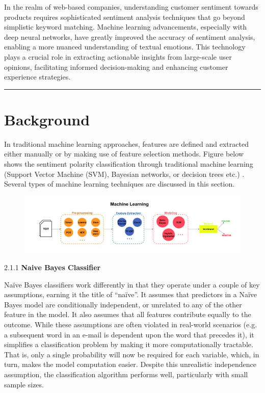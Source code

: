 \documentclass[a4paper]{article}
\theoremstyle{plain}
\theoremstyle{definition}
\begin{document}
In the realm of web-based companies, understanding customer sentiment towards products requires sophisticated sentiment analysis techniques that go beyond simplistic keyword matching. Machine learning advancements, especially with deep neural networks, have greatly improved the accuracy of sentiment analysis, enabling a more nuanced understanding of textual emotions. This technology plays a crucial role in extracting actionable insights from large-scale user opinions, facilitating informed decision-making and enhancing customer experience strategies.
\vspace{0.3 cm}
\hrule{}
\section{Background}
	\label{sec:app}
In traditional machine learning approaches, features are defined and extracted either manually
or by making use of feature selection methods. Figure below shows the
sentiment polarity classification through traditional machine learning (Support
Vector Machine (SVM), Bayesian networks, or decision trees etc.) . Several types of machine learning
techniques are discussed in this section.
\begin{figure}[htbp] %
    \includegraphics[width=1\textwidth]{figs/ml.png} %
    \label{fig:example}
\end{figure}

2.1.1 \textbf{Naive Bayes Classifier\newline}

Naïve Bayes classifiers work differently in that they operate under a couple of key assumptions, earning it the title of “naïve”. It assumes that predictors in a Naïve Bayes model are conditionally independent, or unrelated to any of the other feature in the model. It also assumes that all features contribute equally to the outcome. While these assumptions are often violated in real-world scenarios (e.g. a subsequent word in an e-mail is dependent upon the word that precedes it), it simplifies a classification problem by making it more computationally tractable. That is, only a single probability will now be required for each variable, which, in turn, makes the model computation easier. Despite this unrealistic independence assumption, the classification algorithm performs well, particularly with small sample sizes.\newline
\end{document}
